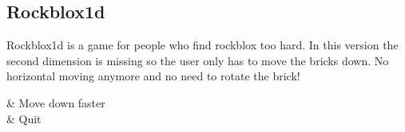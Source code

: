 \subsection{Rockblox1d}

Rockblox1d is a game for people who find rockblox too hard. In this version the
second dimension is missing so the user only has to move the bricks down. No 
horizontal moving anymore and no need to rotate the brick!

\begin{btnmap}
      \PluginDown
        & Move down faster\\

        & Quit\\
\end{btnmap}
